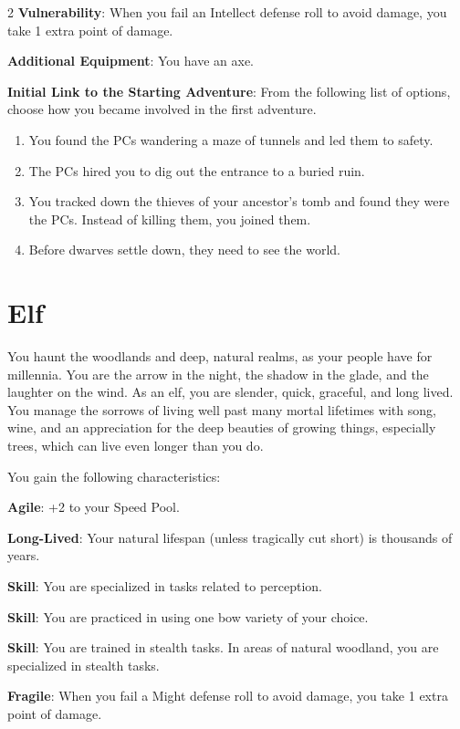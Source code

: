 \begin{multicols}{2}
\textbf{Vulnerability}: When you fail an Intellect defense roll to avoid damage, you take 1 extra point of damage.

\textbf{Additional Equipment}: You have an axe.

\textbf{Initial Link to the Starting Adventure}: From the following list of options, choose how you became involved in the first adventure.

\begin{enumerate}
\item You found the PCs wandering a maze of tunnels and led them to safety.
\item The PCs hired you to dig out the entrance to a buried ruin.
\item You tracked down the thieves of your ancestor’s tomb and found they were the PCs. Instead of killing them, you joined them.
\item Before dwarves settle down, they need to see the world.
\end{enumerate}

\section{Elf}

You haunt the woodlands and deep, natural realms, as your people have for millennia. You are the arrow in the night, the shadow in the glade, and the laughter on the wind. As an elf, you are slender, quick, graceful, and long lived. You manage the sorrows of living well past many mortal lifetimes with song, wine, and an appreciation for the deep beauties of growing things, especially trees, which can live even longer than you do.

You gain the following characteristics:

\textbf{Agile}: +2 to your Speed Pool.

\textbf{Long-Lived}: Your natural lifespan (unless tragically cut short) is thousands of years.

\textbf{Skill}: You are specialized in tasks related to perception.

\textbf{Skill}: You are practiced in using one bow variety of your choice.

\textbf{Skill}: You are trained in stealth tasks. In areas of natural woodland, you are specialized in stealth tasks. 

\textbf{Fragile}: When you fail a Might defense roll to avoid damage, you take 1 extra point of damage.


\end{multicols}
